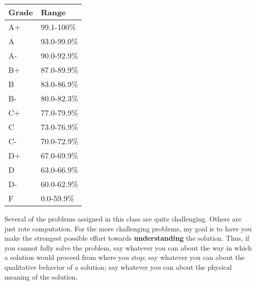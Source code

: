 \documentclass[12pt]{article}
\begin{document}
{\begin{description}
\setlength{\arrayrulewidth}{1mm}
\setlength{\tabcolsep}{8pt}
{
\begin{table}[H]
\label{tab:overall-grade-cutoffs-table}
\begin{tabular}{ll}
\hline
 \textbf{Grade} & \textbf{Range}       \\ \hline
A+    & 99.1-100\%  \\
A     & 93.0-99.0\% \\
A-    & 90.0-92.9\% \\
B+    & 87.0-89.9\% \\
B     & 83.0-86.9\% \\
B-    & 80.0-82.3\% \\
C+    & 77.0-79.9\% \\
C     & 73.0-76.9\% \\
C-    & 70.0-72.9\% \\
D+    & 67.0-69.9\% \\
D     & 63.0-66.9\% \\
D-    & 60.0-62.9\% \\
F     & 0.0-59.9\% 
\end{tabular}
\end{table}
        }
        

  \item[Standard Grading Rubric:]
        Several of the problems assigned in this class are
        quite challenging. Others are just rote computation. For the more
        challenging problems, my goal is to have you make the strongest
        possible effort towards \textbf{understanding} the solution. Thus, if
        you cannot fully solve the problem, say whatever you can about the way
        in which a solution would proceed from where you stop; say whatever
        you can about the qualitative behavior of a solution; say whatever you
        can about the physical meaning of the solution. 


\end{description}}
\end{document}
